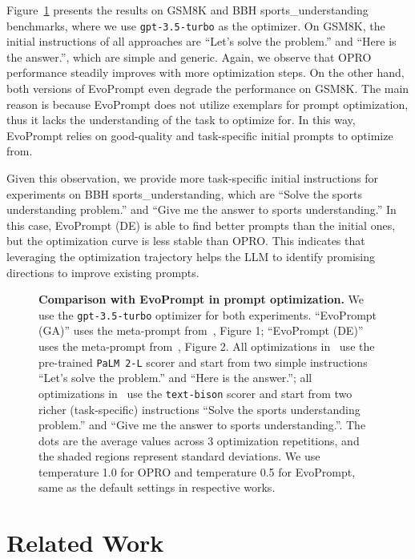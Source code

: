 Figure~\ref{fig:comparison_with_evoprompt} presents the results on GSM8K and BBH sports\_understanding benchmarks, where we use \texttt{gpt-3.5-turbo} as the optimizer. On GSM8K, the initial instructions of all approaches are ``Let's solve the problem.'' and ``Here is the answer.'', which are simple and generic. Again, we observe that OPRO performance steadily improves with more optimization steps. On the other hand, both versions of EvoPrompt even degrade the performance on GSM8K. The main reason is because EvoPrompt does not utilize exemplars for prompt optimization, thus it lacks the understanding of the task to optimize for. In this way, EvoPrompt relies on good-quality and task-specific initial prompts to optimize from.

Given this observation, we provide more task-specific initial instructions for experiments on BBH sports\_understanding, which are ``Solve the sports understanding problem.'' and ``Give me the answer to sports understanding.'' In this case, EvoPrompt (DE) is able to find better prompts than the initial ones, but the optimization curve is less stable than OPRO. This indicates that leveraging the optimization trajectory helps the LLM to identify promising directions to improve existing prompts.

\begin{figure}[t]
\centering
{}
\hspace{.01\linewidth}
\caption{\textbf{Comparison with EvoPrompt in prompt optimization.}
We use the \texttt{gpt-3.5-turbo} optimizer for both experiments.
``EvoPrompt (GA)'' uses the meta-prompt from~\citet{guo2023connecting}, Figure 1; ``EvoPrompt (DE)'' uses the meta-prompt from~\citet{guo2023connecting}, Figure 2.
All optimizations in~ use the pre-trained \texttt{PaLM 2-L} scorer and start from two simple instructions ``Let's solve the problem.'' and ``Here is the answer.''; all optimizations in~ use the \texttt{text-bison} scorer and start from two richer (task-specific) instructions ``Solve the sports understanding problem.'' and ``Give me the answer to sports understanding.''.
The dots are the average values across 3 optimization repetitions, and the shaded regions represent standard deviations.
We use temperature 1.0 for OPRO and temperature 0.5 for EvoPrompt, same as the default settings in respective works.
}
\label{fig:comparison_with_evoprompt}
\end{figure}\section{Related Work}
\label{sec:work}

